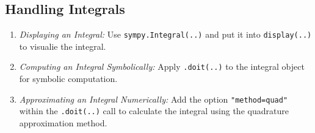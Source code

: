 \subsection{Handling Integrals}\label{subsec:handling_integrals}

\begin{enumerate}
    \item \emph{Displaying an Integral:}
    Use \texttt{sympy.Integral(..)} and put it into \texttt{display(..)} to visualie the integral.
    \item \emph{Computing an Integral Symbolically:}
    Apply \texttt{.doit(..)} to the integral object for symbolic computation.
    \item \emph{Approximating an Integral Numerically:}
    Add the option \texttt{"method=quad"} within the \texttt{.doit(..)} call to calculate the integral using the quadrature approximation method.
\end{enumerate}